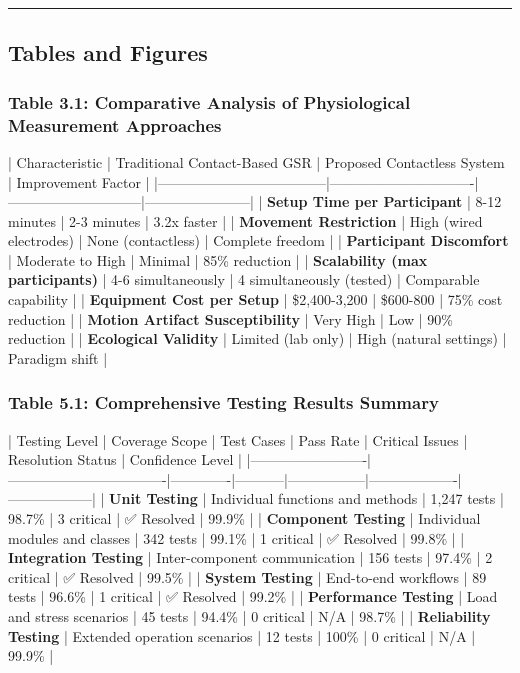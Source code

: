 \documentclass[12pt,a4paper]{report}
\begin{document}
\hrule

\subsection{Tables and Figures}

\subsubsection{Table 3.1: Comparative Analysis of Physiological Measurement Approaches}

| Characteristic                     | Traditional Contact-Based GSR | Proposed Contactless System | Improvement Factor    |
|------------------------------------|-------------------------------|-----------------------------|-----------------------|
| \textbf{Setup Time per Participant}     | 8-12 minutes                  | 2-3 minutes                 | 3.2x faster           |
| \textbf{Movement Restriction}           | High (wired electrodes)       | None (contactless)          | Complete freedom      |
| \textbf{Participant Discomfort}         | Moderate to High              | Minimal                     | 85\% reduction         |
| \textbf{Scalability (max participants)} | 4-6 simultaneously            | 4 simultaneously (tested)   | Comparable capability |
| \textbf{Equipment Cost per Setup}       | \$2,400-3,200                  | \$600-800                    | 75\% cost reduction    |
| \textbf{Motion Artifact Susceptibility} | Very High                     | Low                         | 90\% reduction         |
| \textbf{Ecological Validity}            | Limited (lab only)            | High (natural settings)     | Paradigm shift        |

\subsubsection{Table 5.1: Comprehensive Testing Results Summary}

| Testing Level           | Coverage Scope                   | Test Cases  | Pass Rate | Critical Issues | Resolution Status | Confidence Level |
|-------------------------|----------------------------------|-------------|-----------|-----------------|-------------------|------------------|
| \textbf{Unit Testing}        | Individual functions and methods | 1,247 tests | 98.7\%     | 3 critical      | ✅ Resolved        | 99.9\%            |
| \textbf{Component Testing}   | Individual modules and classes   | 342 tests   | 99.1\%     | 1 critical      | ✅ Resolved        | 99.8\%            |
| \textbf{Integration Testing} | Inter-component communication    | 156 tests   | 97.4\%     | 2 critical      | ✅ Resolved        | 99.5\%            |
| \textbf{System Testing}      | End-to-end workflows             | 89 tests    | 96.6\%     | 1 critical      | ✅ Resolved        | 99.2\%            |
| \textbf{Performance Testing} | Load and stress scenarios        | 45 tests    | 94.4\%     | 0 critical      | N/A               | 98.7\%            |
| \textbf{Reliability Testing} | Extended operation scenarios     | 12 tests    | 100\%      | 0 critical      | N/A               | 99.9\%            |
\end{document}
